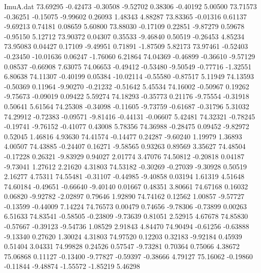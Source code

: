 \begin{filecontents}{ImuA.dat}
  73.69295   -0.42473   -0.30508   -9.52702    0.38306   -0.40192    5.00500
  73.71573   -0.36251   -0.15075   -9.99602    0.26093    1.48343    4.88287
  73.83365   -0.01316    0.61137   -9.69213    0.74181    0.08659    5.60800
  73.88030   -0.17109    0.22851   -9.87279    0.59678   -0.95150    5.12712
  73.90372    0.04307    0.35533   -9.46840    0.50519   -0.26453    4.85234
  73.95083    0.04427    0.17109   -9.49951    0.71891   -1.87509    5.82173
  73.97461   -0.52403   -0.23450  -10.01636    0.06247   -1.76060    6.21864
  74.04369   -0.46899   -0.36610   -9.57129    0.08537   -0.66908    7.63075
  74.06653   -0.49412   -0.53480   -9.50549   -0.77716   -1.32551    6.80638
  74.11307   -0.40199    0.05384  -10.02114   -0.55580   -0.87517    5.11949
  74.13593   -0.50369    0.11964   -9.90270   -0.21232   -0.51642    5.45534
  74.16002   -0.50967    0.19262   -9.75673   -0.09019    0.09422    5.59274
  74.18293   -0.35773    0.21176   -9.75554   -0.31918    0.50641    5.61564
  74.25308   -0.34098   -0.11605   -9.73759   -0.61687   -0.31796    5.31032
  74.29912   -0.72383   -0.09571   -9.81416   -0.44131   -0.06607    5.42481
  74.32321   -0.78245   -0.19741   -9.76152   -0.41077    0.43008    5.78356
  74.36988   -0.28475    0.09452   -9.82972    0.52045    1.46816    4.93630
  74.41574   -0.14477    0.24287   -9.60240    1.19979    1.36893    4.00507
  74.43885   -0.24407    0.16271   -9.58565    0.93263    0.89569    3.35627
  74.48504   -0.17228    0.26321   -9.83929    0.94027    2.01774    3.47076
  74.50812   -0.20818    0.04187   -9.73041    1.27612    2.21620    4.31803
  74.53182   -0.30269   -0.27039   -9.30928    0.50519    2.16277    4.75311
  74.55481   -0.31107   -0.44985   -9.40858    0.03194    1.61319    4.51648
  74.60184   -0.49651   -0.66640   -9.40140    0.01667    0.48351    3.80661
  74.67168    0.16032    0.06820   -9.92782   -2.02897    0.79646    1.92890
  74.74162    0.12562    1.00857   -9.57727   -0.13599   -0.44009    7.14224
  74.76573    0.00479    0.74656   -9.78306   -0.73899    0.00263    6.51633
  74.83541   -0.58505   -0.23809   -9.73639    0.81051    2.52915    4.67678
  74.85830   -0.57667   -0.39123   -9.54736    1.08529    2.91843    4.84470
  74.90494   -0.61256   -0.63888   -9.13340    0.27620    1.30024    4.31803
  74.97520    0.12203    0.32183   -9.92184    0.45939    0.51404    3.04331
  74.99828    0.24526    0.57547   -9.73281    0.70364    0.75066    4.38672
  75.06868    0.11127   -0.13400   -9.77827   -0.59397   -0.38666    4.79127
  75.16062   -0.19860   -0.11844   -9.48874   -1.55572   -1.85219    5.46298

\end{filecontents}
